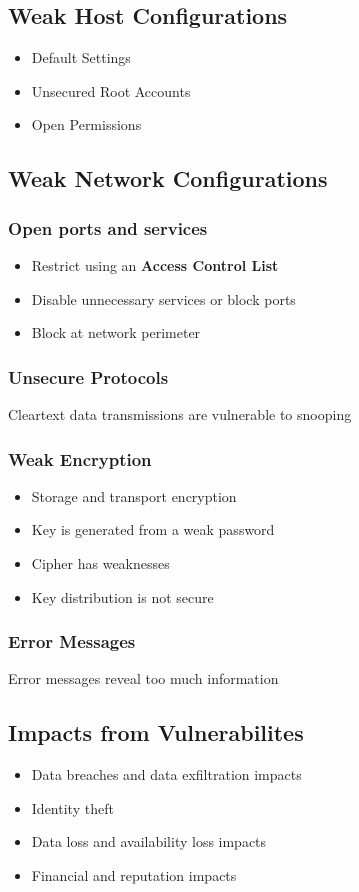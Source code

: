 	\subsection {Weak Host Configurations}
		\begin{itemize}
			\item Default Settings
			\item Unsecured Root Accounts
			\item Open Permissions
		\end{itemize}
	\subsection {Weak Network Configurations}
		\subsubsection {Open ports and services}
			\begin{itemize}
				\item Restrict using an \textbf{Access Control List}
				\item Disable unnecessary services or block ports
				\item Block at network perimeter
			\end{itemize}
		\subsubsection {Unsecure Protocols}
			Cleartext data transmissions are vulnerable to snooping
		\subsubsection {Weak Encryption}
			\begin{itemize}
				\item Storage and transport encryption
				\item Key is generated from a weak password
				\item Cipher has weaknesses
				\item Key distribution is not secure
			\end{itemize}
		\subsubsection {Error Messages}
			Error messages reveal too much information
	\subsection {Impacts from Vulnerabilites}
		\begin{itemize}
			\item Data breaches and data exfiltration impacts
			\item Identity theft
			\item Data loss and availability loss impacts
			\item Financial and reputation impacts
		\end{itemize}
